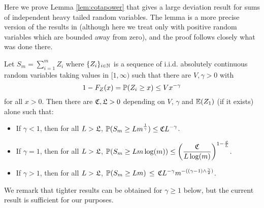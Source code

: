 



Here we prove Lemma \ref{lem:cotapower} that gives a large deviation result for sums of independent heavy tailed random variables. The lemma is a more precise version of the results in \cite{Omelchenko2019} (although here we treat only with positive random variables which are bounded away from zero), and the proof follows closely what was done there.

\begin{lemma}
Let $S_m=\sum_{i=1}^m Z_i$ where $\{Z_i\}_{i\in\mathbb{N}}$ is a sequence of i.i.d. absolutely continuous random variables taking values in $[1,\infty)$ such that there are $V,\gamma>0$ with
\[1-F_Z(x)=\mathbb{P}(Z_i\geq x)\leq Vx^{-\gamma}\] 
for all $x>0$. Then there are $\mathfrak{C},\mathfrak{L}>0$ depending on $V$, $\gamma$ and $\mathbb{E}(Z_1)$ (if it exists) alone such that:
\begin{itemize}
    \item If $\gamma<1$, then for all $L>\mathfrak{L}$,
    $\displaystyle\mathbb{P}(S_m\geq Lm^{\frac{1}{\gamma}})\leq \mathfrak{C} L^{-\gamma}$.
    \item If $\gamma=1$, then for all $L>\mathfrak{L}$, $\displaystyle\mathbb{P}(S_m\geq Lm\log(m))\leq \left(\frac{\mathfrak{C}}{L\log(m)}\right)^{1-\frac{\mathfrak{L}}{L}}$.
    \item If $\gamma>1$, then for all $L>\mathfrak{L}$,
    $\displaystyle\mathbb{P}(S_m\geq Lm)\,\leq\,\mathfrak{C} L^{-\gamma}m^{-((\gamma-1)\wedge\frac{\gamma}{2})}$.
\end{itemize}
\end{lemma}
\begin{remark}
We remark that tighter results can be obtained for $\gamma \ge 1$ below, but the current result is sufficient for our purposes.
\end{remark}
